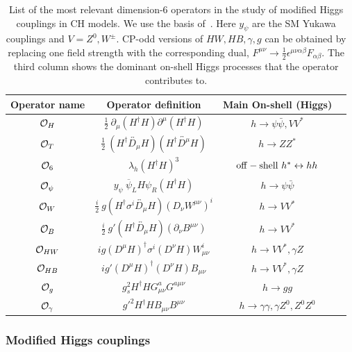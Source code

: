 \documentclass[../report.tex]{subfiles}
\begin{document}
\begin{table}[t]
\begin{center}
{
\begin{tabular}{c|c||c|c} 
\rule{0pt}{1.2em}%
Operator name & Operator definition & Main On-shell (Higgs) \\
\hline
${\cal O}_H$ & $\frac{1}{2}~\partial_\mu(H^\dagger H)\partial^\mu(H^\dagger H)$ & $h\to\psi\bar\psi, VV^*$     \\
${\cal O}_T$ & $\frac{1}{2}~(H^\dagger\overleftrightarrow{D_\mu}H)(H^\dagger\overleftrightarrow{D^\mu}H)$ & $h\to ZZ^*$  \\
${\cal O}_6$ & $\lambda_h(H^\dagger H)^3$ & ${\rm off-shell}~h^*\leftrightarrow hh$  \\
${\cal O}_\psi$ & $y_\psi~\overline\psi_L H\psi_R(H^\dagger H)$ & $h\to\psi\bar\psi$  \\
\hline
${\cal O}_W$ & $\frac{i}{2}~g(H^\dagger\sigma^i\overleftrightarrow{D_\mu} H)(D_\nu W^{\mu\nu})^i$ & $h\to VV^*$ \\
${\cal O}_B$ & $\frac{i}{2}~g'(H^\dagger\overleftrightarrow{D_\mu} H)(\partial_\nu B^{\mu\nu})$ & $h\to VV^*$  \\
%
${\cal O}_{HW}$ & $ig(D^\mu H)^\dagger\sigma^i(D^\nu H)W_{\mu\nu}^i$ & $h\to VV^*,\gamma Z$  \\
${\cal O}_{HB}$ & $ig'(D^\mu H)^\dagger(D^\nu H)B_{\mu\nu}$ & $h\to VV^*,\gamma Z$ \\
\hline
${\cal O}_{g}$ & $g_s^2H^\dagger H G^a_{\mu\nu}G^{a\mu\nu}$ & $h\to gg$  \\
${\cal O}_{\gamma}$ & $g'^2H^\dagger HB_{\mu\nu}B^{\mu\nu}$ & $h\to \gamma\gamma,\gamma Z^0,Z^0Z^0$ 
%
\end{tabular}
}
\end{center}
\caption{\small List of the most relevant dimension-6 operators in the study of modified Higgs couplings in CH models. We use the basis of~\cite{Giudice:2007fh}. Here $y_\psi$ are the SM Yukawa couplings and $V=Z^0,W^\pm$. CP-odd versions of ${HW,HB,\gamma,g}$ can be obtained by replacing one field strength with the corresponding dual, $F^{\mu\nu}\to\frac{1}{2}\epsilon^{\mu\nu\alpha\beta}F_{\alpha\beta}$. The third column shows the dominant on-shell Higgs processes that the operator contributes to. 
\label{tab1}}
\end{table}





\subsubsection{Modified Higgs couplings}
\end{document}

